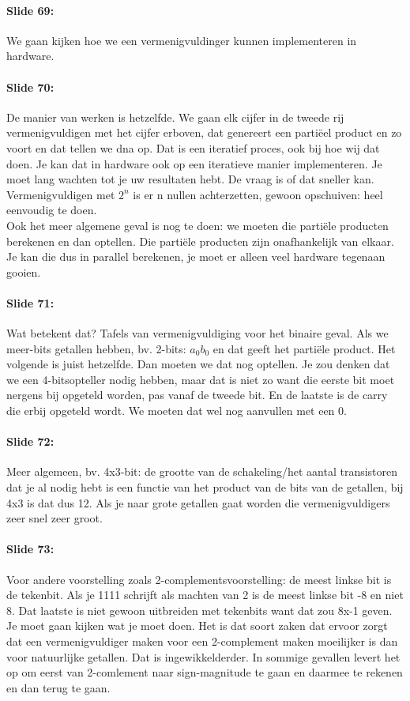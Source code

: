\documentclass[10pt,a4paper]{book}
\begin{document}
\paragraph{Slide 69:} We gaan kijken hoe we een vermenigvuldinger kunnen implementeren in hardware.

\paragraph{Slide 70:} De manier van werken is hetzelfde. We gaan elk cijfer in de tweede rij vermenigvuldigen met het cijfer erboven, dat genereert een parti\"eel product en zo voort en dat tellen we dna op. Dat is een iteratief proces, ook bij hoe wij dat doen. Je kan dat in hardware ook op een iteratieve manier implementeren. Je moet lang wachten tot je uw resultaten hebt. De vraag is of dat sneller kan. Vermenigvuldigen met $2^n$ is er n nullen achterzetten, gewoon opschuiven: heel eenvoudig te doen.\\
Ook het meer algemene geval is nog te doen: we moeten die parti\"ele producten berekenen en dan optellen. Die parti\"ele producten zijn onafhankelijk van elkaar. Je kan die dus in parallel berekenen, je moet er alleen veel hardware tegenaan gooien.

\paragraph{Slide 71:} Wat betekent dat? Tafels van vermenigvuldiging voor het binaire geval. Als we meer-bits getallen hebben, bv. 2-bits: $a_0b_0$ en dat geeft het parti\"ele product. Het volgende is juist hetzelfde. Dan moeten we dat nog optellen. Je zou denken dat we een 4-bitsopteller nodig hebben, maar dat is niet zo want die eerste bit moet nergens bij opgeteld worden, pas vanaf de tweede bit. En de laatste is de carry die erbij opgeteld wordt. We moeten dat wel nog aanvullen met een 0.

\paragraph{Slide 72:} Meer algemeen, bv. 4x3-bit: de grootte van de schakeling/het aantal transistoren dat je al nodig hebt is een functie van het product van de bits van de getallen, bij 4x3 is dat dus 12. Als je naar grote getallen gaat worden die vermenigvuldigers zeer snel zeer groot.

\paragraph{Slide 73:} Voor andere voorstelling zoals 2-complementsvoorstelling: de meest linkse bit is de tekenbit. Als je 1111 schrijft als machten van 2 is de meest linkse bit -8 en niet 8. Dat laatste is niet gewoon uitbreiden met tekenbits want dat zou 8x-1 geven. Je moet gaan kijken wat je moet doen. Het is dat soort zaken dat ervoor zorgt dat een vermenigvuldiger maken voor een 2-complement maken moeilijker is dan voor natuurlijke getallen. Dat is ingewikkelderder. In sommige gevallen levert het op om eerst van 2-comlement naar sign-magnitude te gaan en daarmee te rekenen en dan terug te gaan.
\end{document}
